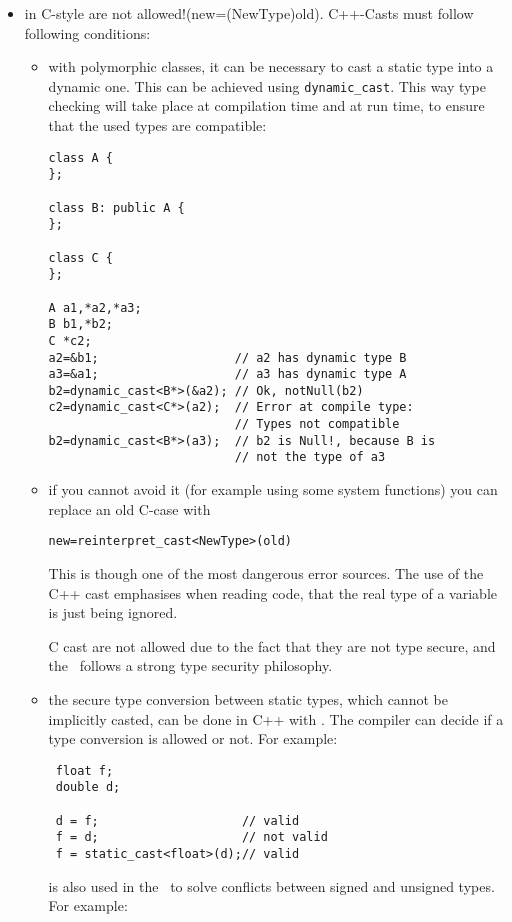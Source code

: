 \begin{itemize}
\item {} in C-style are not allowed!(new=(NewType)old).
  C++-Casts must follow following conditions:
\begin{itemize}
\item with polymorphic classes, it can be necessary to cast a static type into
  a dynamic one.  This can be achieved using
  \verb+dynamic_cast+.  This way type checking
  will take place at compilation time and at run time, to ensure that the used
  types are compatible:
\begin{verbatim}
class A {
};

class B: public A {
};

class C {
};

A a1,*a2,*a3;
B b1,*b2;
C *c2;
a2=&b1;                   // a2 has dynamic type B
a3=&a1;                   // a3 has dynamic type A
b2=dynamic_cast<B*>(&a2); // Ok, notNull(b2)
c2=dynamic_cast<C*>(a2);  // Error at compile type:
                          // Types not compatible
b2=dynamic_cast<B*>(a3);  // b2 is Null!, because B is
                          // not the type of a3
\end{verbatim}
\item if you cannot avoid it (for example using some system functions) you can
  replace an old C-case with
\begin{verbatim}
new=reinterpret_cast<NewType>(old)
\end{verbatim}
This is though one of the most dangerous error sources. The use of the C++
cast emphasises when reading code, that the real type of a variable is just
being ignored.

C cast are not allowed due to the fact that they are not type secure, and the
\ltilib\ follows a strong type security philosophy.

\item the secure type conversion between static types, which cannot be
  implicitly casted, can be done in C++ with .  The
  compiler can decide if a type conversion is allowed or not.  For example:
\begin{verbatim}
 float f;
 double d;

 d = f;                    // valid
 f = d;                    // not valid
 f = static_cast<float>(d);// valid
\end{verbatim}

\staticcast is also used in the \ltilib\ to solve conflicts between signed and
unsigned types.  For example:


\end{itemize}
\end{itemize}
